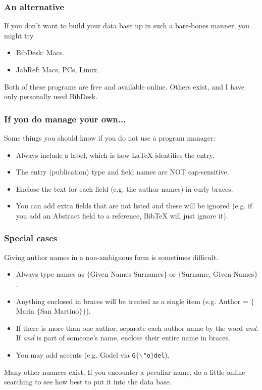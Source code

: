 \begin{frame}  \frametitle{An alternative}
	If you don't want to build your data base up in such a bare-bones manner, you might try
	\begin{itemize}
		\item BibDesk: Macs.
		\item JabRef: Macs, PCs, Linux.
	\end{itemize}
	Both of these programs are free and available online. Others exist, and I have only personally used BibDesk.
\end{frame}

\begin{frame}  \frametitle{If you do manage your own...}
	Some things you should know if you do not use a program manager:
	\begin{itemize}
		\item Always include a label, which is how LaTeX identifies the entry.
		\item The entry (publication) type and field names are NOT cap-sensitive.
		\item Enclose the text for each field (e.g. the author names) in curly braces.
		\item You can add extra fields that are not listed and these will be ignored (e.g. if you add an Abstract field to a reference, BibTeX will just ignore it).
	\end{itemize}
\end{frame}

\begin{frame}  \frametitle{Special cases}
	Giving author names in a non-ambiguous form is sometimes difficult.
	\begin{itemize}
		\item Always type names as $\{$Given Names Surnames$\}$ or $\{$Surname, Given Names$\}$.
		\item Anything enclosed in braces will be treated as a single item (e.g. Author = {\color{braces}$\{${\color{black}Maria} $\{${\color{black}San Martino}$\}\}$}).
		\item If there is more than one author, separate each author name by the word \textit{and}. If \textit{and} is part of someone's name, enclose their entire name in braces.
		\item You may add accents (e.g. G$\ddot{\text{o}}$del via \texttt{G$\{\backslash$"o$\}$del}).
	\end{itemize}
	Many other nuances exist. If you encounter a peculiar name, do a little online searching to see how best to put it into the data base.
\end{frame}

